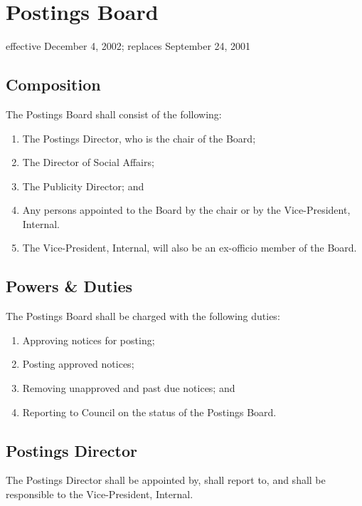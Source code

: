 \section{Postings Board}
effective December 4, 2002; replaces September 24, 2001

\subsection{Composition}
The Postings Board shall consist of the following:
\begin{enumerate}
\item The Postings Director, who is the chair of the Board;
\item The Director of Social Affairs;
\item The Publicity Director; and
\item Any persons appointed to the Board by the chair or by the Vice-President, Internal.
\item The Vice-President, Internal, will also be an ex-officio member of the Board.
\end{enumerate}

\subsection{Powers \& Duties}
The Postings Board shall be charged with the following duties:
\begin{enumerate}
\item Approving notices for posting;
\item Posting approved notices;
\item Removing unapproved and past due notices; and
\item Reporting to Council on the status of the Postings Board.
\end{enumerate}

\subsection{Postings Director}
The Postings Director shall be appointed by, shall report to, and shall be responsible to the Vice-President, Internal.


